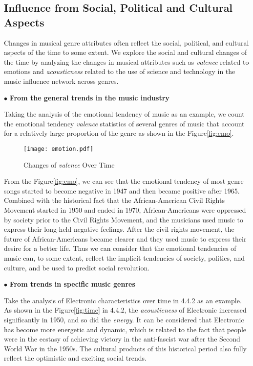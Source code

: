\documentclass[12pt]{article}  %
\begin{document}
\subsection{Influence from Social, Political and Cultural Aspects}

Changes in musical genre attributes often reflect the social, political, and cultural aspects of the time to some extent. We explore the social and cultural changes of the time by analyzing the changes in musical attributes such as \emph{valence} related to emotions and \emph{acousticness} related to the use of science and technology in the music influence network across genres.

$\bullet$ \textbf{From the general trends in the music industry}

Taking the analysis of the emotional tendency of music as an example, we count the emotional tendency \emph{valence} statistics of several genres of music that account for a relatively large proportion of the genre as shown in the Figure\eqref{fig:emo}. 

\begin{figure}[htbp]
	\centering
	\texttt{[image: emotion.pdf]}
	\caption{Changes of \emph{valence} Over Time}\label{fig:emo}
\end{figure}
\vspace{-0.5cm}
From the Figure\eqref{fig:emo}, we can see that the emotional tendency of most genre songs started to become negative in 1947 and then became positive after 1965. Combined with the historical fact that the African-American Civil Rights Movement started in 1950 and ended in 1970, African-Americans were oppressed by society prior to the Civil Rights Movement, and the musicians used music to express their long-held negative feelings. After the civil rights movement, the future of African-Americans became clearer and they used music to express their desire for a better life. Thus we can consider that the emotional tendencies of music can, to some extent, reflect the implicit tendencies of society, politics, and culture, and be used to predict social revolution.

$\bullet$ \textbf{From trends in specific music genres}

Take the analysis of Electronic characteristics over time in 4.4.2 as an example. As shown in the Figure\eqref{fig:time} in 4.4.2, the \emph{acousticness} of Electronic increased significantly in 1950, and so did the \emph{energy}. It can be considered that Electronic has become more energetic and dynamic, which is related to the fact that people were in the ecstasy of achieving victory in the anti-fascist war after the Second World War in the 1950s. The cultural products of this historical period also fully reflect the optimistic and exciting social trends.
\end{document}
